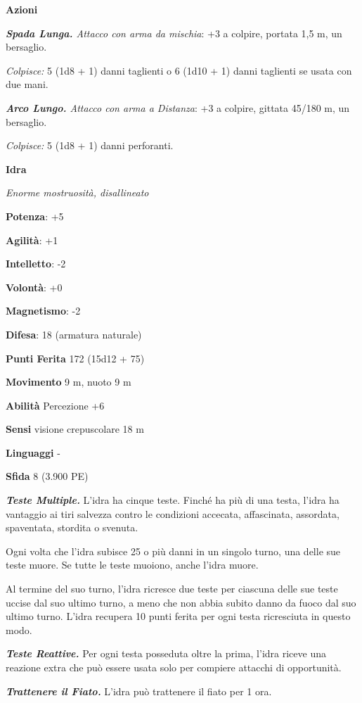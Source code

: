 \begin{multicols}{2}
\textbf{Azioni}

\emph{\textbf{Spada Lunga.} Attacco con arma da mischia}: +3 a colpire,
portata 1,5 m, un bersaglio.

\emph{Colpisce:} 5 (1d8 + 1) danni taglienti o 6 (1d10 + 1) danni
taglienti se usata con due mani.

\emph{\textbf{Arco Lungo.} Attacco con arma a Distanza}: +3 a colpire,
gittata 45/180 m, un bersaglio.

\emph{Colpisce:} 5 (1d8 + 1) danni perforanti.



\textbf{Idra}

\emph{Enorme mostruosità, disallineato}

\textbf{Potenza}: +5

\textbf{Agilità}: +1

\textbf{Intelletto}: -2

\textbf{Volontà}: +0

\textbf{Magnetismo}: -2

\textbf{Difesa}: 18 (armatura naturale)

\textbf{Punti Ferita} 172 (15d12 + 75)

\textbf{Movimento} 9 m, nuoto 9 m

\textbf{Abilità} Percezione +6

\textbf{Sensi} visione crepuscolare 18 m

\textbf{Linguaggi} -

\textbf{Sfida} 8 (3.900 PE)

\emph{\textbf{Teste Multiple.}} L'idra ha cinque teste. Finché ha più di
una testa, l'idra ha vantaggio ai tiri salvezza contro le condizioni
accecata, affascinata, assordata, spaventata, stordita o svenuta.

Ogni volta che l'idra subisce 25 o più danni in un singolo turno, una
delle sue teste muore. Se tutte le teste muoiono, anche l'idra muore.

Al termine del suo turno, l'idra ricresce due teste per ciascuna delle
sue teste uccise dal suo ultimo turno, a meno che non abbia subito danno
da fuoco dal suo ultimo turno. L'idra recupera 10 punti ferita per ogni
testa ricresciuta in questo modo.

\emph{\textbf{Teste Reattive.}} Per ogni testa posseduta oltre la prima,
l'idra riceve una reazione extra che può essere usata solo per compiere
attacchi di opportunità.

\emph{\textbf{Trattenere il Fiato.}} L'idra può trattenere il fiato per
1 ora.


\end{multicols}
